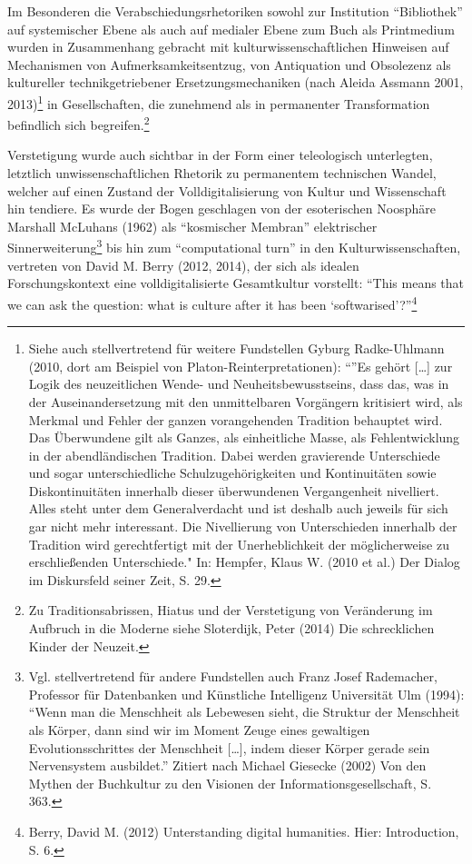 \documentclass[a4paper,
fontsize=11pt,
oneside,
numbers=noperiodatend,
parskip=half-,
bibliography=totoc,
final
]{scrartcl}
\begin{document}
Im Besonderen die Verabschiedungsrhetoriken sowohl zur Institution
\enquote{Bibliothek} auf systemischer Ebene als auch auf medialer Ebene
zum Buch als Printmedium wurden in Zusammenhang gebracht mit
kulturwissenschaftlichen Hinweisen auf Mechanismen von
Aufmerksamkeitsentzug, von Antiquation und Obsolezenz als kultureller
technikgetriebener Ersetzungsmechaniken (nach Aleida Assmann 2001,
2013)\footnote{Siehe auch stellvertretend für weitere Fundstellen Gyburg
  Radke-Uhlmann (2010, dort am Beispiel von Platon-Reinterpretationen):
  \enquote{}Es gehört {[}\ldots{}{]} zur Logik des neuzeitlichen Wende-
  und Neuheitsbewusstseins, dass das, was in der Auseinandersetzung mit
  den unmittelbaren Vorgängern kritisiert wird, als Merkmal und Fehler
  der ganzen vorangehenden Tradition behauptet wird. Das Überwundene
  gilt als Ganzes, als einheitliche Masse, als Fehlentwicklung in der
  abendländischen Tradition. Dabei werden gravierende Unterschiede und
  sogar unterschiedliche Schulzugehörigkeiten und Kontinuitäten sowie
  Diskontinuitäten innerhalb dieser überwundenen Vergangenheit
  nivelliert. Alles steht unter dem Generalverdacht und ist deshalb auch
  jeweils für sich gar nicht mehr interessant. Die Nivellierung von
  Unterschieden innerhalb der Tradition wird gerechtfertigt mit der
  Unerheblichkeit der möglicherweise zu erschließenden Unterschiede."
  In: Hempfer, Klaus W. (2010 et al.) Der Dialog im Diskursfeld seiner
  Zeit, S. 29.} in Gesellschaften, die zunehmend als in permanenter
Transformation befindlich sich begreifen.\footnote{Zu
  Traditionsabrissen, Hiatus und der Verstetigung von Veränderung im
  Aufbruch in die Moderne siehe Sloterdijk, Peter (2014) Die
  schrecklichen Kinder der Neuzeit.}

Verstetigung wurde auch sichtbar in der Form einer teleologisch
unterlegten, letztlich unwissenschaftlichen Rhetorik zu permanentem
technischen Wandel, welcher auf einen Zustand der Volldigitalisierung
von Kultur und Wissenschaft hin tendiere. Es wurde der Bogen geschlagen
von der esoterischen Noosphäre Marshall McLuhans (1962) als
\enquote{kosmischer Membran} elektrischer Sinnerweiterung\footnote{Vgl.
  stellvertretend für andere Fundstellen auch Franz Josef Rademacher,
  Professor für Datenbanken und Künstliche Intelligenz Universität Ulm
  (1994): \enquote{Wenn man die Menschheit als Lebewesen sieht, die
  Struktur der Menschheit als Körper, dann sind wir im Moment Zeuge
  eines gewaltigen Evolutionsschrittes der Menschheit {[}\ldots{}{]},
  indem dieser Körper gerade sein Nervensystem ausbildet.} Zitiert nach
  Michael Giesecke (2002) Von den Mythen der Buchkultur zu den Visionen
  der Informationsgesellschaft, S. 363.} bis hin zum
\enquote{computational turn} in den Kulturwissenschaften, vertreten von
David M. Berry (2012, 2014), der sich als idealen Forschungskontext eine
volldigitalisierte Gesamtkultur vorstellt: \enquote{This means that we
can ask the question: what is culture after it has been
\enquote{softwarised}?}\footnote{Berry, David M. (2012) Unterstanding
  digital humanities. Hier: Introduction, S. 6.}
\end{document}

